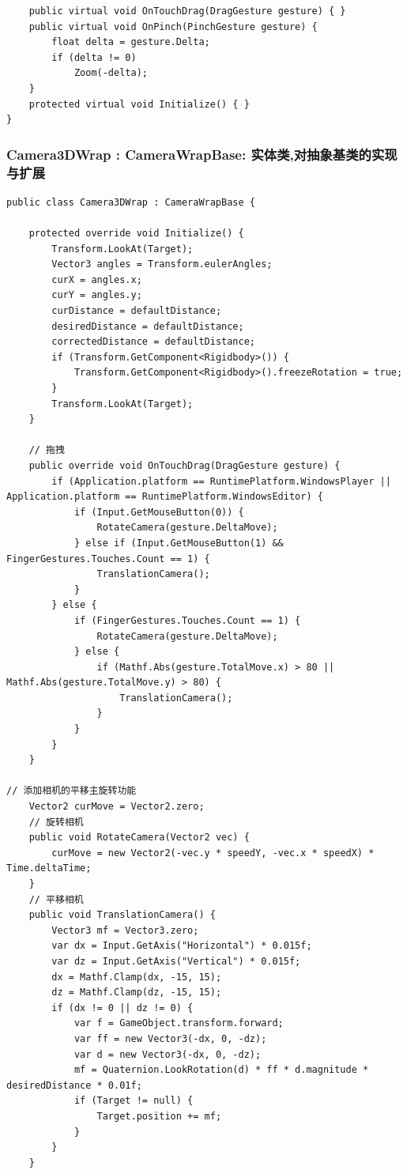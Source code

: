 \documentclass[9pt, b5paper]{article}
\begin{document}
\begin{verbatim}
    public virtual void OnTouchDrag(DragGesture gesture) { }
    public virtual void OnPinch(PinchGesture gesture) {
        float delta = gesture.Delta;
        if (delta != 0) 
            Zoom(-delta);
    }
    protected virtual void Initialize() { }
}
\end{verbatim}
\subsubsection{Camera3DWrap : CameraWrapBase: 实体类,对抽象基类的实现与扩展}
\label{sec-9-3-2}
\begin{verbatim}
public class Camera3DWrap : CameraWrapBase {

    protected override void Initialize() {
        Transform.LookAt(Target);
        Vector3 angles = Transform.eulerAngles;
        curX = angles.x;
        curY = angles.y;
        curDistance = defaultDistance;
        desiredDistance = defaultDistance;
        correctedDistance = defaultDistance;
        if (Transform.GetComponent<Rigidbody>()) {
            Transform.GetComponent<Rigidbody>().freezeRotation = true;
        }
        Transform.LookAt(Target);
    }

    // 拖拽
    public override void OnTouchDrag(DragGesture gesture) {
        if (Application.platform == RuntimePlatform.WindowsPlayer || Application.platform == RuntimePlatform.WindowsEditor) {
            if (Input.GetMouseButton(0)) {
                RotateCamera(gesture.DeltaMove);
            } else if (Input.GetMouseButton(1) && FingerGestures.Touches.Count == 1) {
                TranslationCamera();
            }
        } else {
            if (FingerGestures.Touches.Count == 1) {
                RotateCamera(gesture.DeltaMove);
            } else {
                if (Mathf.Abs(gesture.TotalMove.x) > 80 || Mathf.Abs(gesture.TotalMove.y) > 80) {
                    TranslationCamera();
                }
            }
        }
    }

// 添加相机的平移主旋转功能
    Vector2 curMove = Vector2.zero;
    // 旋转相机
    public void RotateCamera(Vector2 vec) {
        curMove = new Vector2(-vec.y * speedY, -vec.x * speedX) * Time.deltaTime;
    }
    // 平移相机
    public void TranslationCamera() {
        Vector3 mf = Vector3.zero;
        var dx = Input.GetAxis("Horizontal") * 0.015f;
        var dz = Input.GetAxis("Vertical") * 0.015f;
        dx = Mathf.Clamp(dx, -15, 15);
        dz = Mathf.Clamp(dz, -15, 15);
        if (dx != 0 || dz != 0) {
            var f = GameObject.transform.forward;
            var ff = new Vector3(-dx, 0, -dz);
            var d = new Vector3(-dx, 0, -dz);
            mf = Quaternion.LookRotation(d) * ff * d.magnitude * desiredDistance * 0.01f;
            if (Target != null) {
                Target.position += mf;
            }
        }
    }


\end{verbatim}
\end{document}
